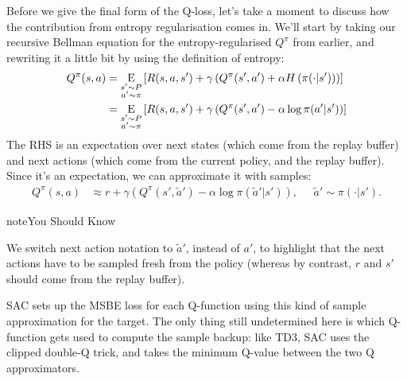 \documentclass[letterpaper,10pt,english]{sphinxmanual}
\newcommand{\E}{{\mathrm E}}
\newcommand{\underE}[2]{\underset{\begin{subarray}{c}#1 \end{subarray}}{\E}\left[ #2 \right]}
\begin{document}
Before we give the final form of the Q-loss, let’s take a moment to discuss how the contribution from entropy regularisation comes in. We’ll start by taking our recursive Bellman equation for the entropy-regularised \(Q^{\pi}\) from earlier, and rewriting it a little bit by using the definition of entropy:
\begin{equation*}
\begin{split}Q^{\pi}(s,a) &= \underE{s' \sim P \\ a' \sim \pi}{R(s,a,s') + \gamma\left(Q^{\pi}(s',a') + \alpha H\left(\pi(\cdot|s')\right) \right)} \\
&= \underE{s' \sim P \\ a' \sim \pi}{R(s,a,s') + \gamma\left(Q^{\pi}(s',a') - \alpha \log \pi(a'|s') \right)}\end{split}
\end{equation*}
The RHS is an expectation over next states (which come from the replay buffer) and next actions (which come from the current policy, and  the replay buffer). Since it’s an expectation, we can approximate it with samples:
\begin{equation*}
\begin{split}Q^{\pi}(s,a) &\approx r + \gamma\left(Q^{\pi}(s',\tilde{a}') - \alpha \log \pi(\tilde{a}'|s') \right), \;\;\;\;\;  \tilde{a}' \sim \pi(\cdot|s').\end{split}
\end{equation*}
\begin{sphinxadmonition}{note}{You Should Know}

We switch next action notation to \(\tilde{a}'\), instead of \(a'\), to highlight that the next actions have to be sampled fresh from the policy (whereas by contrast, \(r\) and \(s'\) should come from the replay buffer).
\end{sphinxadmonition}

SAC sets up the MSBE loss for each Q-function using this kind of sample approximation for the target. The only thing still undetermined here is which Q-function gets used to compute the sample backup: like TD3, SAC uses the clipped double-Q trick, and takes the minimum Q-value between the two Q approximators.
\end{document}
